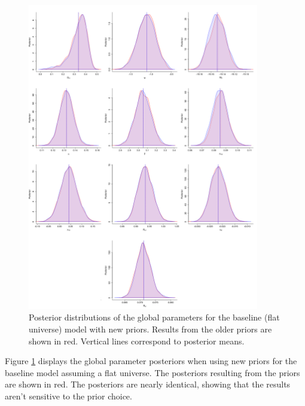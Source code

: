 \begin{figure}
\centering
	\includegraphics[width=0.9\textwidth]{figures/ode/base_flat_all.png}
\caption{Posterior distributions of the global parameters for the baseline (flat universe) model with new priors. Results from the older priors are shown in red. Vertical lines correspond to posterior means.}
\label{fig:ode_base_flat}
\end{figure}

Figure \ref{fig:ode_base_flat} displays the global parameter posteriors when using new priors for the baseline model assuming a flat universe. The posteriors resulting from the \citet{Shariff+others:2016} priors are shown in red. The posteriors are nearly identical, showing that the results aren't sensitive to the prior choice.

